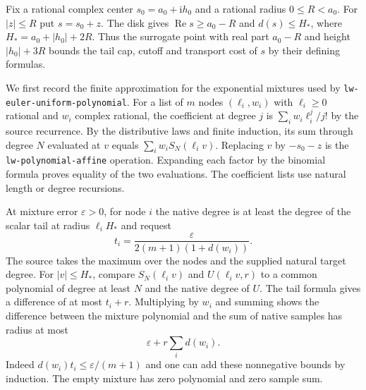 \documentclass[11pt]{amsart}
\theoremstyle{definition}
\theoremstyle{remark}
\numberwithin{equation}{section}
\newcommand{\re}{\operatorname{Re}}
\newcommand{\code}[1]{\nolinkurl{#1}}
\begin{document}
Fix a rational complex center $s_0=a_0+\mathrm i h_0$ and a
rational radius $0\le R<a_0$. For $|z|\le R$ put $s=s_0+z$.
The disk gives $\re s\ge a_0-R$ and $d(s)\le H_*$, where
$H_*=a_0+|h_0|+2R$. Thus the surrogate point with real part
$a_0-R$ and height $|h_0|+3R$ bounds the tail cap, cutoff and
transport cost of $s$ by their defining formulas.

We first record the finite approximation for the exponential
mixtures used by \code{lw-euler-uniform-polynomial}. For a list
of $m$ nodes $(\ell_i,w_i)$ with $\ell_i\ge0$ rational and
$w_i$ complex rational, the coefficient at degree $j$ is
$\sum_i w_i\ell_i^j/j!$ by the source recurrence. By the
distributive laws and finite induction, its sum through degree
$N$ evaluated at $v$ equals $\sum_i w_i S_N(\ell_i v)$.
Replacing $v$ by $-s_0-z$ is the \code{lw-polynomial-affine}
operation. Expanding each factor by the binomial formula
proves equality of the two evaluations. The coefficient lists
use natural length or degree recursions.

At mixture error $\varepsilon>0$, for node $i$ the native
degree is at least the degree of the scalar tail at radius
$\ell_i H_*$ and request
\[
        t_i=\frac{\varepsilon}{2(m+1)(1+d(w_i))}.
\]
The source takes the maximum over the nodes and the supplied
natural target degree. For $|v|\le H_*$, compare
$S_N(\ell_i v)$ and $U(\ell_i v,r)$ to a common polynomial
of degree at least $N$ and the native degree of $U$.
The tail formula gives a difference of at most $t_i+r$.
Multiplying by $w_i$ and summing shows the difference between
the mixture polynomial and the sum of native samples has
radius at most
\[
        \varepsilon+r\sum_i d(w_i).
\]
Indeed $d(w_i)t_i\le\varepsilon/(m+1)$ and one can add
these nonnegative bounds by induction. The empty mixture
has zero polynomial and zero sample sum.
\end{document}
